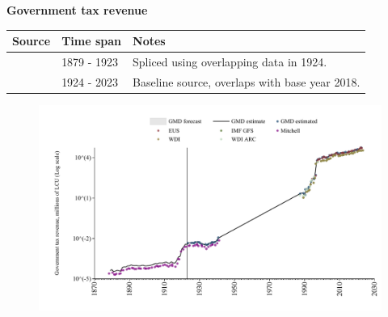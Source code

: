\documentclass[12pt,a4paper,landscape]{article}
\begin{document}
\begin{adjustbox}{max totalsize={\paperwidth}{\paperheight},center}
\begin{minipage}[t][\textheight][t]{\textwidth}
\vspace*{0.5cm}
{}
\begin{center}
{\Large\bfseries Government tax revenue}
\end{center}
\vspace{0.5cm}
\begin{table}[H]
\centering
\small
\begin{tabular}{|l|l|l|}
\hline
\textbf{Source} & \textbf{Time span} & \textbf{Notes} \\
\hline
\rowcolor{white}\cite{Mitchell}& 1879 - 1923 &Spliced using overlapping data in 1924. \\
\rowcolor{lightgray}\cite{GMD_estimated}& 1924 - 2023 &Baseline source, overlaps with base year 2018. \\
\hline
\end{tabular}
\end{table}
\begin{figure}[H]
\centering
\includegraphics[width=\textwidth,height=0.6\textheight,keepaspectratio]{graphs/BGR_govtax.pdf}
\end{figure}
\end{minipage}
\end{adjustbox}
\end{document}
